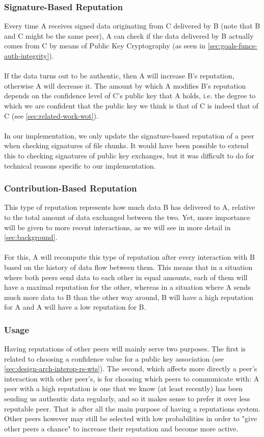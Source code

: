 \documentclass[]{article}
\begin{document}
\subsubsection{Signature-Based Reputation}
\label{sec:sig-based-rep}
Every time A receives signed data originating from C delivered by B (note that B and C might be the same peer), A can check if the data delivered by B actually comes from C by means of Public Key Cryptography (as seen in \ref{sec:goals-funcs-auth-integrity}).
\\\\
If the data turns out to be authentic, then A will increase B's reputation, otherwise A will decrease it.
The amount by which A modifies B's reputation depends on the confidence level of C's public key that A holds, i.e. the degree to which we are confident that the public key we think is that of C is indeed that of C (see \ref{sec:related-work-wot}).
\\\\
In our implementation, we only update the signature-based reputation of a peer when checking signatures of file chunks.
It would have been possible to extend this to checking signatures of public key exchanges, but it was difficult to do for technical reasons specific to our implementation.

\subsubsection{Contribution-Based Reputation}
This type of reputation represents how much data B has delivered to A, relative to the total amount of data exchanged between the two.
Yet, more importance will be given to more recent interactions, as we will see in more detail in \ref{sec:background}.
\\\\
For this, A will recompute this type of reputation after every interaction with B based on the history of data flow between them.
This means that in a situation where both peers send data to each other in equal amounts, each of them will have a maximal reputation for the other, whereas in a situation where A sends much more data to B than the other way around, B will have a high reputation for A and A will have a low reputation for B.

\subsubsection{Usage}
Having reputations of other peers will mainly serve two purposes.
The first is related to choosing a confidence value for a public key association (see \ref{sec:design-arch-interop-rs-wts}).
The second, which affects more directly a peer's interaction with other peer's, is for choosing which peers to communicate with:
A peer with a high reputation is one that we know (at least recently) has been sending us authentic data regularly, and so it makes sense to prefer it over less reputable peer.
That is after all the main purpose of having a reputations system.
Other peers however may still be selected with low probabilities in order to "give other peers a chance" to increase their reputation and become more active.
\end{document}
